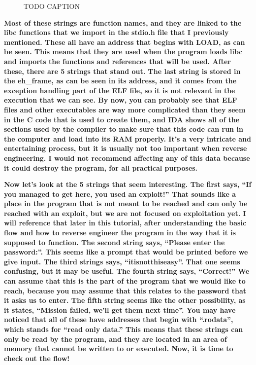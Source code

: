 \documentclass[letterpaper]{article}
\newcommand{\sitfig}[3]{
\begin{figure}[H]
\centering
\makebox[\textwidth][c]{
#2
}
\caption{#3}
\label{#1}
\end{figure}
}
\newcommand{\sitgfx}[4][scale=1.0]{
\sitfig{#3}{\texttt{[image: \#2]}}{#4}
}
\begin{document}
  
\sitgfx[width=6.1252in,height=3.8335in]{FINALWORKINGDOCFORMERLYPRECURSOR-img046.png}{fig:unk}{TODO CAPTION}
 \textbf{Most of these strings are function names, and they are linked to the libc functions that we import in the
stdio.h file that I previously mentioned. These all have an address that begins with LOAD, as can be seen. This means
that they are used when the program loads libc and imports the functions and references that will be used. After these,
there are 5 strings that stand out. The last string is stored in the eh\_frame, as can be seen in its address, and it
comes from the exception handling part of the ELF file, so it is not relevant in the execution that we can see. By now,
you can probably see that ELF files and other executables are way more complicated than they seem in the C code that is
used to create them, and IDA shows all of the sections used by the compiler to make sure that this code can run in the
computer and load into its RAM properly. It's a very intricate and entertaining process, but it is usually not too
important when reverse engineering. I would not recommend affecting any of this data because it could destroy the
program, for all practical purposes.}

\textbf{Now let's look at the 5 strings that seem interesting. The first says, ``If you managed to get here, you used an
exploit!'' That sounds like a place in the program that is not meant to be reached and can only be reached with an
exploit, but we are not focused on exploitation yet. I will reference that later in this tutorial, after understanding
the basic flow and how to reverse engineer the program in the way that it is supposed to function. The second string
says, ``Please enter the password:''. This seems like a prompt that would be printed before we give input. The third
strings says, ``itisnotthiseasy''. That one seems confusing, but it may be useful. The fourth string says, ``Correct!''
We can assume that this is the part of the program that we would like to reach, because you may assume that this
relates to the password that it asks us to enter. The fifth string seems like the other possibility, as it states,
``Mission failed, we'll get them next time''. You may have noticed that all of these have addresses that begin with
``.rodata'', which stands for ``read only data.'' This means that these strings can only be read by the program, and
they are located in an area of memory that cannot be written to or executed. Now, it is time to check out the flow!}
\end{document}
